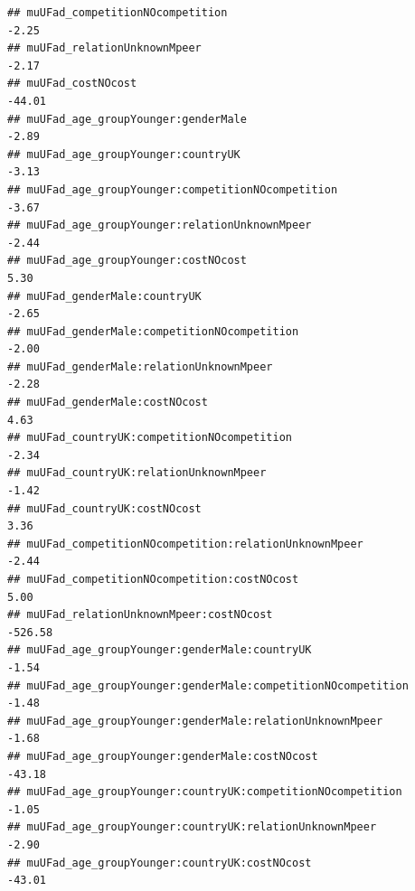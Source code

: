 \documentclass[
]{article}
\begin{document}
\begin{verbatim}
## muUFad_competitionNOcompetition                                                                 -2.25
## muUFad_relationUnknownMpeer                                                                     -2.17
## muUFad_costNOcost                                                                              -44.01
## muUFad_age_groupYounger:genderMale                                                              -2.89
## muUFad_age_groupYounger:countryUK                                                               -3.13
## muUFad_age_groupYounger:competitionNOcompetition                                                -3.67
## muUFad_age_groupYounger:relationUnknownMpeer                                                    -2.44
## muUFad_age_groupYounger:costNOcost                                                               5.30
## muUFad_genderMale:countryUK                                                                     -2.65
## muUFad_genderMale:competitionNOcompetition                                                      -2.00
## muUFad_genderMale:relationUnknownMpeer                                                          -2.28
## muUFad_genderMale:costNOcost                                                                     4.63
## muUFad_countryUK:competitionNOcompetition                                                       -2.34
## muUFad_countryUK:relationUnknownMpeer                                                           -1.42
## muUFad_countryUK:costNOcost                                                                      3.36
## muUFad_competitionNOcompetition:relationUnknownMpeer                                            -2.44
## muUFad_competitionNOcompetition:costNOcost                                                       5.00
## muUFad_relationUnknownMpeer:costNOcost                                                        -526.58
## muUFad_age_groupYounger:genderMale:countryUK                                                    -1.54
## muUFad_age_groupYounger:genderMale:competitionNOcompetition                                     -1.48
## muUFad_age_groupYounger:genderMale:relationUnknownMpeer                                         -1.68
## muUFad_age_groupYounger:genderMale:costNOcost                                                  -43.18
## muUFad_age_groupYounger:countryUK:competitionNOcompetition                                      -1.05
## muUFad_age_groupYounger:countryUK:relationUnknownMpeer                                          -2.90
## muUFad_age_groupYounger:countryUK:costNOcost                                                   -43.01

\end{verbatim}
\end{document}
